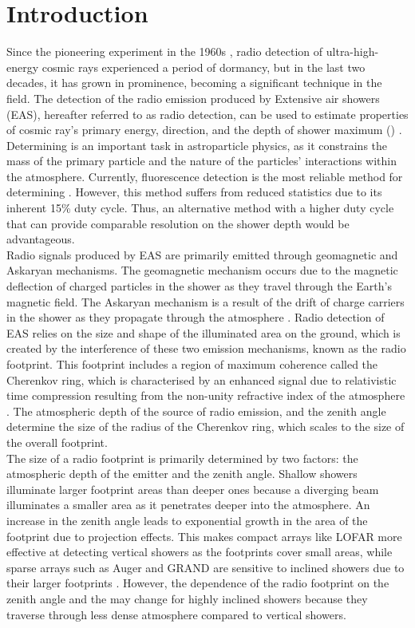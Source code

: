\section{Introduction}

Since the pioneering experiment in the 1960s \cite{ALLAN1966}, radio detection of ultra-high-energy cosmic rays experienced a period of dormancy, but in the last two decades, it has grown in prominence, becoming a significant technique in the field. The detection of the radio emission produced by Extensive air showers (EAS), hereafter referred to as radio detection, can be used to estimate properties of cosmic ray's primary energy, direction, and the depth of shower maximum (\xmax) \cite{Huege2014}. Determining \xmax is an important task in astroparticle physics, as it constrains the mass of the primary particle and the nature of the particles' interactions within the atmosphere. Currently, fluorescence detection is the most reliable method for determining \xmax. However, this method suffers from reduced statistics due to its inherent 15\% duty cycle. Thus, an alternative method with a higher duty cycle that can provide comparable resolution on the shower depth would be advantageous. \\Radio signals produced by EAS are primarily emitted through geomagnetic and Askaryan mechanisms. The geomagnetic mechanism occurs due to the magnetic deflection of charged particles in the shower as they travel through the Earth's magnetic field. The Askaryan mechanism is a result of the drift of charge carriers in the shower as they propagate through the atmosphere \cite{ALVAREZMUNIZ201429}. Radio detection of EAS relies on the size and shape of the illuminated area on the ground, which is created by the interference of these two emission mechanisms, known as the radio footprint. This footprint includes a region of maximum coherence called the Cherenkov ring, which is characterised by an enhanced signal due to relativistic time compression resulting from the non-unity refractive index of the atmosphere \cite{2011PhRvL.107f1101D}. The atmospheric depth of the source of radio emission, and the zenith angle determine the size of the radius of the Cherenkov ring, which scales to the size of the overall footprint.\\
The size of a radio footprint is primarily determined by two factors: the atmospheric depth of the emitter and the zenith angle. Shallow showers illuminate larger footprint areas than deeper ones because a diverging beam illuminates a smaller area as it penetrates deeper into the atmosphere. An increase in the zenith angle leads to exponential growth in the area of the footprint due to projection effects. This makes compact arrays like LOFAR more effective at detecting vertical showers as the footprints cover small areas, while sparse arrays such as Auger and GRAND are sensitive to inclined showers due to their larger footprints \cite{2018JCAP...10..026A}. However, the dependence of the radio footprint on the zenith angle and the \xmax may change for highly inclined showers because they traverse through less dense atmosphere compared to vertical showers.\\
